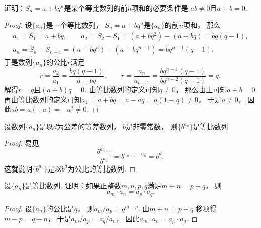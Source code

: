 \begin{example}
证明：\(S_n = a + b q^n\)是某个等比数列的前\(n\)项和的必要条件是
\(a b \neq 0\)且\(a + b = 0\).
\begin{proof}
设\(\{a_n\}\)是一个等比数列，
\(S_n = a + b q^n\)是\(\{a_n\}\)的前\(n\)项和，
那么\begin{gather*}
	a_1
	= S_1
	= a + b q,
	\qquad
	a_2
	= S_2 - S_1
	= (a + b q^2) - (a + b q)
	= b q (q - 1), \\
	a_n
	= S_n - S_{n-1}
	= (a + b q^n) - (a + b q^{n-1})
	= b q^{n-1} (q - 1).
\end{gather*}
于是数列\(\{a_n\}\)的公比\(r\)满足\begin{equation*}
	r
	= \frac{a_2}{a_1}
	= \frac{b q (q - 1)}{a + b q},
	\qquad
	r
	= \frac{a_n}{a_{n-1}}
	= \frac{b q^{n-1} (q - 1)}{b q^{n-2} (q - 1)}
	= q,
\end{equation*}
解得\(r = q\)且\((a + b) q = 0\).
由等比数列的定义可知\(q \neq 0\)，
那么由上可知\(a + b = 0\).
再由等比数列的定义可知\(
	a_1
	= a + b q
	= a - a q
	= a (1 - q)
	\neq 0
\)，
于是\(a \neq 0\)，
因此\(
	a b
	= a (-a)
	= - a^2
	\neq 0
\).
\end{proof}
\end{example}

\begin{property}
设数列\(\{a_n\}\)是以\(d\)为公差的等差数列，
\(b\)是非零常数，
则\(\{b^{a_n}\}\)是等比数列.
\begin{proof}
易见\begin{equation*}
	\frac{b^{a_{n+1}}}{b^{a_n}}
	= b^{a_{n+1}-a_n}
	= b^d,
\end{equation*}
这就说明\(\{b^{a_n}\}\)是以\(b^d\)为公比的等比数列.
\end{proof}
\end{property}

\begin{example}
设\(\{a_n\}\)是等比数列.
证明：如果正整数\(m,n,p,q\)满足\(m+n=p+q\)，
则\begin{equation*}
	a_m \cdot a_n = a_p \cdot a_q.
\end{equation*}
\begin{proof}
设\(\{a_n\}\)的公比是\(q\)，
则\(a_m / a_p = q^{m-p}\).
由\(m+n=p+q\)
移项得\(m-p=q-n\)，
于是\(a_m / a_p = a_q / a_n\)，
因此\(a_m \cdot a_n=a_p \cdot a_q\).
\end{proof}
\end{example}

